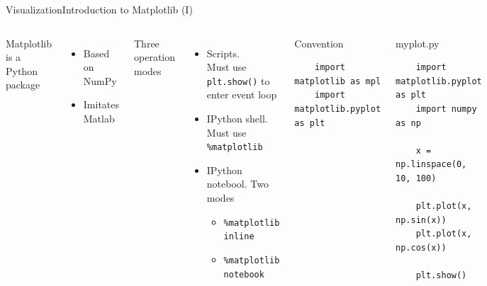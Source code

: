 \documentclass[10pt,compress]{beamer} %
\begin{document}
\begin{frame}[fragile]{Visualization}{Introduction to Matplotlib (I)}
	\begin{columns}
	Matplotlib is a Python package
	\begin{itemize}
		\item Based on NumPy
		\item Imitates Matlab
	\end{itemize}
	Three operation modes
	\begin{itemize}
		\item Scripts. \\Must use \texttt{plt.show()} to enter event loop
		\item IPython shell. \\Must use \texttt{\%matplotlib}
		\item IPython notebool. Two modes
		\begin{itemize}
			\item \texttt{\%matplotlib inline}
			\item \texttt{\%matplotlib notebook}
		\end{itemize}
	\end{itemize}

	\begin{block}{\footnotesize{Convention}}
	\vspace{-0.2cm} 
	\begin{lstlisting}
	import matplotlib as mpl
	import matplotlib.pyplot as plt
	\end{lstlisting}
	\vspace{-0.2cm} 
	\end{block}

	\begin{exampleblock}{\footnotesize{myplot.py}}
	\vspace{-0.2cm} 
	\begin{lstlisting}
	import matplotlib.pyplot as plt
	import numpy as np

	x = np.linspace(0, 10, 100)

	plt.plot(x, np.sin(x))
	plt.plot(x, np.cos(x))

	plt.show()
	\end{lstlisting}
	\vspace{-0.2cm} 
	\end{exampleblock}

	\end{columns}
\end{frame}
\end{document}
